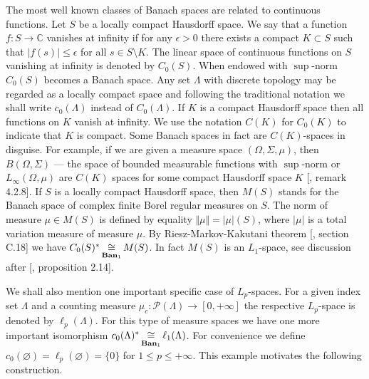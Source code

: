 The most well known classes of Banach spaces are related to continuous functions. Let $S$ be a locally compact Hausdorff space. We say that a function $f:S\to\mathbb{C}$ vanishes at infinity  if for any $\epsilon>0$ there exists a compact $K\subset S$ such that $|f(s)|\leq\epsilon$ for all $s\in S\setminus K$. The linear space of continuous functions on $S$ vanishing at infinity is denoted by $C_0(S)$. When endowed with $\sup$-norm $C_0(S)$ becomes a Banach space. Any set $\Lambda$ with discrete topology may be regarded as a locally compact space and following the traditional notation we shall write $c_0(\Lambda)$ instead of $C_0(\Lambda)$. If $K$ is a compact Hausdorff space then all functions on $K$ vanish at infinity. We use the notation $C(K)$ for $C_0(K)$ to indicate that $K$ is compact. Some Banach spaces in fact are $C(K)$-spaces in disguise. For example, if we are given a measure space $(\Omega,\Sigma,\mu)$, then $B(\Omega,\Sigma)$ --- the space of bounded measurable functions with $\sup$-norm or $L_\infty(\Omega,\mu)$ are $C(K)$ spaces for some compact Hausdorff space $K$ [\cite{KalAlbTopicsBanSpTh}, remark 4.2.8]. If $S$ is a locally compact Hausdorff space, then $M(S)$ stands for the Banach space of complex finite Borel regular measures on $S$. The norm of measure $\mu\in M(S)$ is defined by equality $\Vert\mu\Vert=|\mu|(S)$, where $|\mu|$ is a total variation measure of measure $\mu$. By Riesz-Markov-Kakutani theorem  [\cite{ConwACoursInFuncAn}, section C.18] we have $C_0(S)^*\mathop{\mathbin{\cong}}\limits_{\mathbf{Ban}_1}M(S)$. In fact $M(S)$ is an $L_1$-space, see discussion after [\cite{DalLauSecondDualOfMeasAlg}, proposition 2.14]. 

We shall also mention one important specific case of $L_p$-spaces. For a given index set $\Lambda$ and a counting measure $\mu_c:\mathcal{P}(\Lambda)\to[0,+\infty]$ the respective $L_p$-space is denoted by $\ell_p(\Lambda)$. For this type of measure spaces we have one more important isomorphism $c_0(\Lambda)^*\mathop{\mathbin{\cong}}\limits_{\mathbf{Ban}_1}\ell_1(\Lambda)$. For convenience we define $c_0(\varnothing)=\ell_p(\varnothing)=\{0\}$ for $1\leq p\leq+\infty$. This example motivates the following construction.

